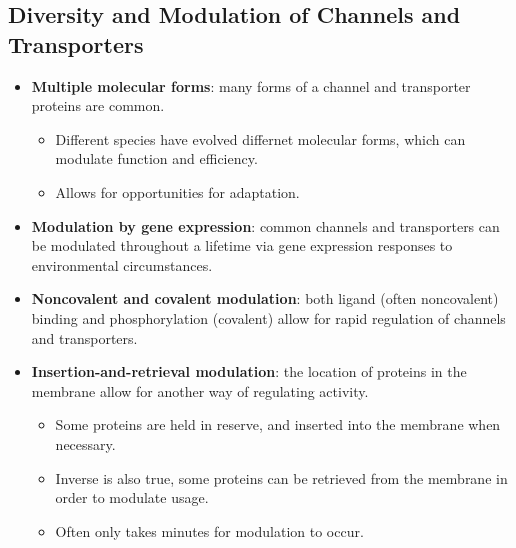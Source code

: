 \documentclass[12pt,a4paper]{article}
\begin{document}
\subsection{Diversity and Modulation of Channels and Transporters}
\begin{itemize}
    \item \textbf{Multiple molecular forms}: many forms of a channel and transporter proteins are common. 
        \begin{itemize}
            \item Different species have evolved differnet molecular forms, which can modulate function and efficiency.
            \item Allows for opportunities for adaptation.
        \end{itemize}
    \item \textbf{Modulation by gene expression}: common channels and transporters can be modulated throughout a lifetime via gene expression responses to environmental circumstances.
    \item \textbf{Noncovalent and covalent modulation}: both ligand (often noncovalent) binding and phosphorylation (covalent) allow for {\color{o-Sun}rapid} regulation of channels and transporters.
    \item \textbf{Insertion-and-retrieval modulation}: the {\color{o-Sun}location} of proteins in the membrane allow for another way of regulating activity.
        \begin{itemize}
            \item Some proteins are held in reserve, and {\color{o-Sun}inserted} into the membrane when necessary.
            \item Inverse is also true, some proteins can be {\color{o-Sun}retrieved} from the membrane in order to modulate usage.
            \item Often only takes minutes for modulation to occur.
        \end{itemize}
\end{itemize}
\end{document}
